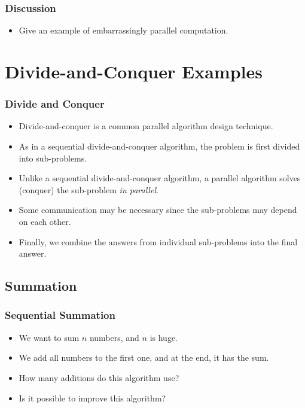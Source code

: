 \documentclass{beamer}
\begin{document}
\begin{CJK}{UTF8}{bsmi}
\begin{frame}
\frametitle{Discussion}
\begin{itemize}
\item Give an example of embarrassingly parallel computation.
\end{itemize}
\end{frame}

\section{Divide-and-Conquer Examples}

\begin{frame}
\frametitle{Divide and Conquer}
\begin{itemize}
\item Divide-and-conquer is a common parallel algorithm design technique.
\item As in a sequential divide-and-conquer algorithm, the problem is first divided into sub-problems.
\item Unlike a sequential divide-and-conquer algorithm, a parallel algorithm solves (conquer) the sub-problem {\em in parallel}.
\item Some communication may be necessary since the sub-problems may depend on each other.
\item Finally, we combine the answers from individual sub-problems into the final answer.
\end{itemize}
\end{frame}


\subsection{Summation}

\begin{frame}
\frametitle{Sequential Summation}
\begin{itemize}
\item We want to sum $n$ numbers, and $n$ is huge.
\item We add all numbers to the first one, and at the end, it has the sum.
\item How many additions do this algorithm use?
\item Is it possible to improve this algorithm?
\end{itemize}
\end{frame}


\end{CJK}
\end{document}
